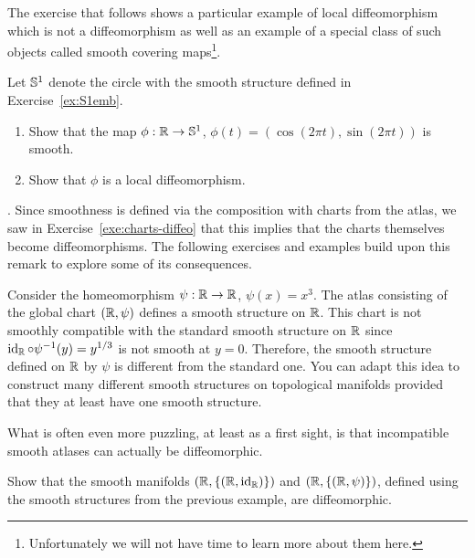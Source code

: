 The exercise that follows shows a particular example of local diffeomorphism which is not a diffeomorphism as well as an example of a special class of such objects called smooth covering maps\footnote{Unfortunately we will not have time to learn more about them here.}.

\begin{exercise}
  Let $\mathbb{S}^1$ denote the circle with the smooth structure defined in Exercise~\ref{ex:S1emb}.
  \begin{enumerate}
    \item Show that the map $\phi: \mathbb{R} \to \mathbb{S}^1$, $\phi(t) = (\cos(2\pi t), \sin(2\pi t))$ is smooth.
    \item Show that $\phi$ is a local diffeomorphism.
  \end{enumerate}
\end{exercise}

. Since smoothness is defined via the composition with charts from the atlas,
we saw in Exercise~\ref{exe:charts-diffeo} that this implies that the charts themselves become diffeomorphisms.
The following exercises and examples build upon this remark to explore some of its consequences.

\begin{example}
  Consider the homeomorphism $\psi:\mathbb{R}\to\mathbb{R}$, $\psi(x) = x^3$.
  The atlas consisting of the global chart $(\mathbb{R}, \psi)$ defines a smooth structure on $\mathbb{R}$.
  This chart is not smoothly compatible with the standard smooth structure on $\mathbb{R}$ since $\operatorname{id}_{\mathbb{R}} \circ \psi^{-1} (y) = y^{1/3}$ is not smooth at $y=0$.
  Therefore, the smooth structure defined on $\mathbb{R}$ by $\psi$ is different from the standard one.
  You can adapt this idea to construct many different smooth structures on topological manifolds provided that they at least have one smooth structure.
\end{example}

What is often even more puzzling, at least as a first sight, is that incompatible smooth atlases can actually be diffeomorphic.

\begin{exercise}
  Show that the smooth manifolds $(\mathbb{R}, \{(\mathbb{R}, \operatorname{id}_{\mathbb{R}})\})$ and $(\mathbb{R}, \{(\mathbb{R}, \psi)\})$, defined using the smooth structures from the previous example, are diffeomorphic.
\end{exercise}

